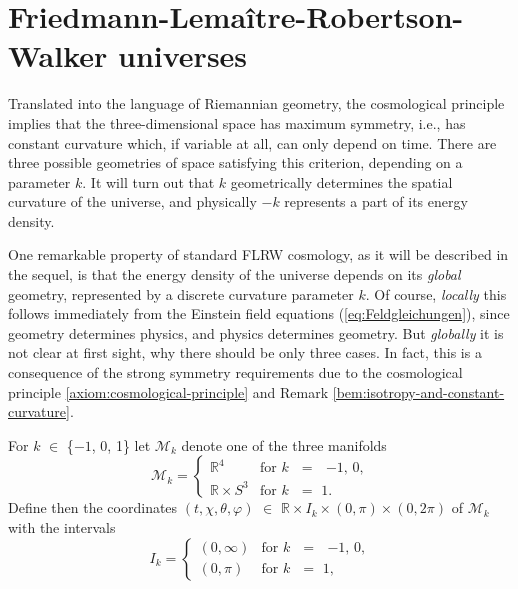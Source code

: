 \section{Friedmann-Lemaître-Robertson-Walker universes}
\label{sec:FLRW-universes}

Translated into the language of Riemannian geometry, the cosmological principle implies that the three-dimensional space has maximum symmetry, i.e., has constant curvature which, if variable at all, can only depend on time. There are three possible geometries of space satisfying this criterion, depending on a parameter $k$. \cite[222]{Stephani-1991}
It will turn out that $k$ geometrically determines the spatial curvature of the universe, and physically $-k$ represents a part of its energy density. \cite[155]{Sexl-Urbantke-1987}

\begin{bem}
	One remarkable property of standard FLRW cosmology, as it will be described in the sequel, is that  the energy density of the universe depends on its \emph{global} geometry, represented by a discrete curvature parameter $k$. Of course, \emph{locally} this follows immediately from the Einstein field equations (\ref{eq:Feldgleichungen}), since geometry determines physics, and physics determines geometry. But \emph{globally} it is not clear at first sight, why there should be only three cases. In fact, this is a consequence of the strong symmetry requirements due to the cosmological principle \ref{axiom:cosmological-principle} and Remark \ref{bem:isotropy-and-constant-curvature}.
\end{bem}
%
For $k$ $\in$ \{$-1$, 0, 1\} let $\mathscr{M}_k$ denote one of the three manifolds
\begin{equation}
	\mathscr{M}_k = \left\{\begin{array}{cl}
		\mathbb{R}^4 & \mbox{for $k$ $=$ $-1$, 0,} \\
		\mathbb{R} \times S^3 & \mbox{for $k$ $=$ 1.}
	\end{array}\right.
	\label{eq:FLRW-manifolds} %
\end{equation}
Define then the coordinates $(t,\chi,\theta,\varphi)$ $\in$ $\mathbb{R} \times I_k \times (0,\pi) \times (0, 2\pi)$ of $\mathscr{M}_k$ with the intervals
\begin{equation}
	I_k = \left\{ \begin{array}{ll}
		(0, \infty) & \mbox{for $k$ $=$ $-1$, 0,} \\
		(0, \pi) & \mbox{for $k$ $=$ 1,}
	\end{array}\right.
	\label{eq:FLRW-tau-interval} %
\end{equation}
